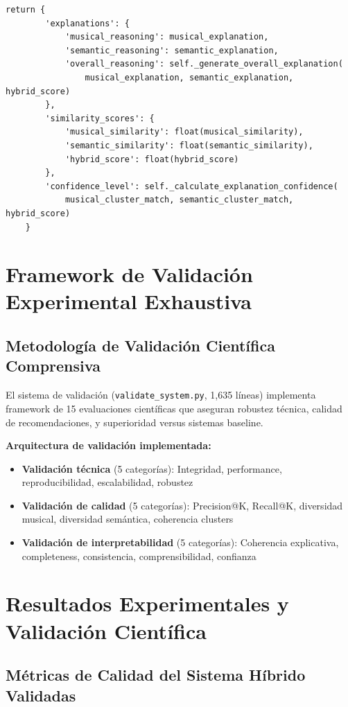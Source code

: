 \documentclass[12pt,a4paper]{report}
\begin{document}
\begin{lstlisting}[caption={Generación Automática de Explicaciones Comprensivas}]
    return {
        'explanations': {
            'musical_reasoning': musical_explanation,
            'semantic_reasoning': semantic_explanation,
            'overall_reasoning': self._generate_overall_explanation(
                musical_explanation, semantic_explanation, hybrid_score)
        },
        'similarity_scores': {
            'musical_similarity': float(musical_similarity),
            'semantic_similarity': float(semantic_similarity),
            'hybrid_score': float(hybrid_score)
        },
        'confidence_level': self._calculate_explanation_confidence(
            musical_cluster_match, semantic_cluster_match, hybrid_score)
    }
\end{lstlisting}

\section{Framework de Validación Experimental Exhaustiva}

\subsection{Metodología de Validación Científica Comprensiva}

El sistema de validación (\texttt{validate\_system.py}, 1,635 líneas) implementa framework de 15 evaluaciones científicas que aseguran robustez técnica, calidad de recomendaciones, y superioridad versus sistemas baseline.

\textbf{Arquitectura de validación implementada:}
\begin{itemize}
    \item \textbf{Validación técnica} (5 categorías): Integridad, performance, reproducibilidad, escalabilidad, robustez
    \item \textbf{Validación de calidad} (5 categorías): Precision@K, Recall@K, diversidad musical, diversidad semántica, coherencia clusters
    \item \textbf{Validación de interpretabilidad} (5 categorías): Coherencia explicativa, completeness, consistencia, comprensibilidad, confianza
\end{itemize}

\section{Resultados Experimentales y Validación Científica}

\subsection{Métricas de Calidad del Sistema Híbrido Validadas}
\end{document}
